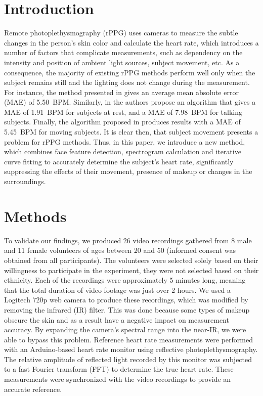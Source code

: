 \section{Introduction}\label{introduction}

Remote photoplethysmography (rPPG) uses cameras to measure the subtle changes in the person’s skin color and calculate the heart rate, which introduces a number of factors that complicate measurements, such as dependency on the intensity and position of ambient light sources, subject movement, etc. As a consequence, the majority of existing rPPG methods \cite{sinhal, salim} perform well only when the subject remains still and the lighting does not change during the measurement. For instance, the method presented in \cite{lernia} gives an average mean absolute error (MAE) of 5.50~BPM. Similarly, in \cite{haugg} the authors propose an algorithm that gives a MAE of 1.91~BPM for subjects at rest, and a MAE of 7.98~BPM for talking subjects. Finally, the algorithm proposed in \cite{artemyev} produces results with a MAE of 5.45~BPM for moving subjects. It is clear then, that subject movement presents a problem for rPPG methods. Thus, in this paper, we introduce a new method, which combines face feature detection, spectrogram calculation and iterative curve fitting to accurately determine the subject’s heart rate, significantly suppressing the effects of their movement, presence of makeup or changes in the surroundings.

\section{Methods}\label{methods}

To validate our findings, we produced 26 video recordings gathered from 8 male and 11 female volunteers of ages between 20 and 50 (informed consent was obtained from all participants). The volunteers were selected solely based on their willingness to participate in the experiment, they were not selected based on their ethnicity. Each of the recordings were approximately 5 minutes long, meaning that the total duration of video footage was just over 2 hours. We used a Logitech 720p web camera to produce these recordings, which was modified by removing the infrared (IR) filter. This was done because some types of makeup obscure the skin and as a result have a negative impact on measurement accuracy. By expanding the camera’s spectral range into the near-IR, we were able to bypass this problem. Reference heart rate measurements were performed with an Arduino-based heart rate monitor using reflective photoplethysmography. The relative amplitude of reflected light recorded by this monitor was subjected to a fast Fourier transform (FFT) to determine the true heart rate. These measurements were synchronized with the video recordings to provide an accurate reference.

